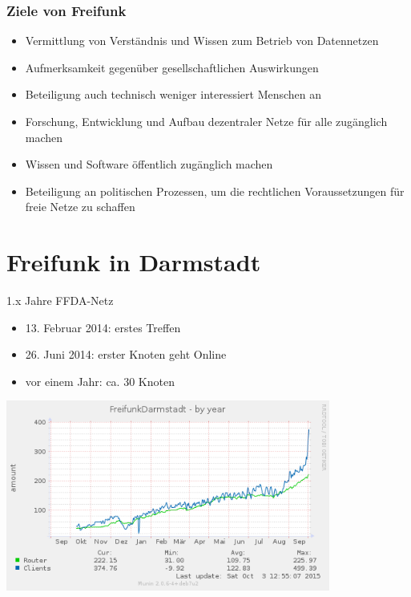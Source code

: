 \documentclass[10pt]{beamer}
\begin{document}
\begin{frame}
	\frametitle{Ziele von Freifunk}
	\begin{itemize}[<+->]
		\item Vermittlung von Verständnis und Wissen zum Betrieb von Datennetzen
		\item Aufmerksamkeit gegenüber gesellschaftlichen Auswirkungen
		\item Beteiligung auch technisch weniger interessiert Menschen an 
		\item Forschung, Entwicklung und Aufbau dezentraler Netze für alle zugänglich machen
		\item Wissen und Software öffentlich zugänglich machen
		\item Beteiligung an politischen Prozessen, um die rechtlichen Voraussetzungen für freie Netze zu schaffen
	\end{itemize}
\end{frame}


\section{Freifunk in Darmstadt}



\begin{frame}{1.x Jahre FFDA-Netz}
	\vfill
	\begin{itemize}[<+->]
		\item 13. Februar 2014: erstes Treffen
		\item 26. Juni 2014: erster Knoten geht Online
		\item vor einem Jahr: ca. 30 Knoten
	\end{itemize}
	\pause
	\begin{center}
		\includegraphics[width=0.8\textwidth]{images/ffda-Okt14-15}
	\end{center}
\end{frame}
\end{document}
